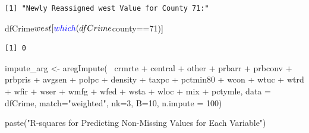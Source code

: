 \documentclass[]{article}
\newenvironment{Shaded}{}{}
\newcommand{\DataTypeTok}[1]{#1}
\newcommand{\DecValTok}[1]{#1}
\newcommand{\KeywordTok}[1]{\textcolor[rgb]{0.00,0.00,1.00}{#1}}
\newcommand{\NormalTok}[1]{#1}
\newcommand{\OperatorTok}[1]{#1}
\newcommand{\StringTok}[1]{\textcolor[rgb]{0.00,0.50,0.50}{#1}}
\begin{document}
\begin{verbatim}
[1] "Newly Reassigned west Value for County 71:"
\end{verbatim}

\begin{Shaded}
\begin{Highlighting}[]
\NormalTok{dfCrime}\OperatorTok{$}\NormalTok{west[}\KeywordTok{which}\NormalTok{(dfCrime}\OperatorTok{$}\NormalTok{county}\OperatorTok{==}\DecValTok{71}\NormalTok{)]}
\end{Highlighting}
\end{Shaded}

\begin{verbatim}
[1] 0
\end{verbatim}

\begin{Shaded}
\begin{Highlighting}[]
\NormalTok{impute_arg <-}\StringTok{ }\KeywordTok{aregImpute}\NormalTok{(}\OperatorTok{~}\StringTok{ }\NormalTok{crmrte }\OperatorTok{+}\StringTok{ }\NormalTok{central }\OperatorTok{+}\StringTok{ }\NormalTok{other }\OperatorTok{+}
\StringTok{                         }\NormalTok{prbarr }\OperatorTok{+}\StringTok{ }\NormalTok{prbconv }\OperatorTok{+}\StringTok{ }\NormalTok{prbpris }\OperatorTok{+}\StringTok{ }\NormalTok{avgsen }\OperatorTok{+}\StringTok{ }\NormalTok{polpc }\OperatorTok{+}\StringTok{ }
\StringTok{                         }\NormalTok{density }\OperatorTok{+}\StringTok{ }\NormalTok{taxpc }\OperatorTok{+}\StringTok{ }\NormalTok{pctmin80 }\OperatorTok{+}\StringTok{ }\NormalTok{wcon }\OperatorTok{+}\StringTok{ }\NormalTok{wtuc }\OperatorTok{+}
\StringTok{                         }\NormalTok{wtrd }\OperatorTok{+}\StringTok{ }\NormalTok{wfir }\OperatorTok{+}\StringTok{ }\NormalTok{wser }\OperatorTok{+}\StringTok{ }\NormalTok{wmfg }\OperatorTok{+}\StringTok{ }\NormalTok{wfed }\OperatorTok{+}\StringTok{ }\NormalTok{wsta }\OperatorTok{+}\StringTok{ }\NormalTok{wloc }\OperatorTok{+}
\StringTok{                         }\NormalTok{mix }\OperatorTok{+}\StringTok{ }\NormalTok{pctymle, }\DataTypeTok{data =}\NormalTok{ dfCrime, }\DataTypeTok{match=}\StringTok{"weighted"}\NormalTok{,}
                         \DataTypeTok{nk=}\DecValTok{3}\NormalTok{, }\DataTypeTok{B=}\DecValTok{10}\NormalTok{, }\DataTypeTok{n.impute =} \DecValTok{100}\NormalTok{)}
\end{Highlighting}
\end{Shaded}

\begin{Shaded}
\begin{Highlighting}[]
\KeywordTok{paste}\NormalTok{(}\StringTok{"R-squares for Predicting Non-Missing Values for Each Variable"}\NormalTok{)}
\end{Highlighting}
\end{Shaded}
\end{document}
